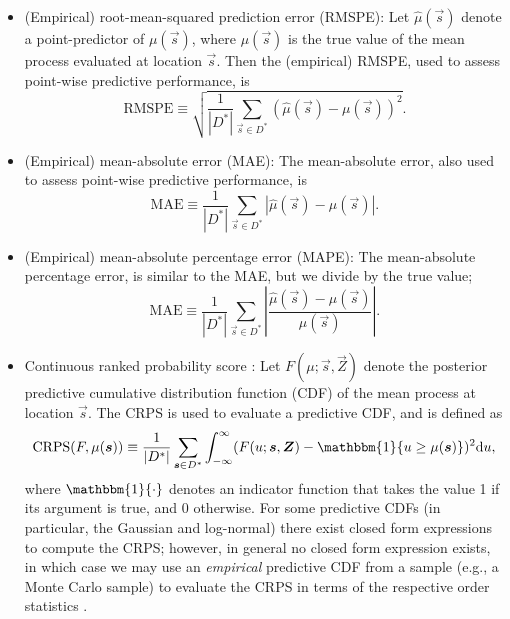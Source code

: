 \documentclass[12pt,a4paper]{article}
\begin{document}
\begin{appendices}
\begin{itemize}
    \item (Empirical) root-mean-squared prediction error (RMSPE): Let $\hat{\mu}(\vec{s})$ denote a point-predictor of $\mu(\vec{s})$, where $\mu(\vec{s})$ is the true value of the mean process evaluated at location $\vec{s}$. Then the (empirical) RMSPE, used to assess point-wise predictive performance, is
    \begin{equation*}
        \textrm{RMSPE}
        \equiv
        \sqrt{\frac{1}{|D^*|}\sum_{\vec{s} \in D^*}(\hat{\mu}(\vec{s}) - \mu(\vec{s}))^2}.
    \end{equation*}
    \item (Empirical) mean-absolute error (MAE): The mean-absolute error, also used to assess point-wise predictive performance, is
    \begin{equation*}
        \textrm{MAE}
        \equiv
        \frac{1}{|D^*|}\sum_{\vec{s} \in D^*}|\hat{\mu}(\vec{s}) - \mu(\vec{s})|.
    \end{equation*}
    \item (Empirical) mean-absolute percentage error (MAPE): The mean-absolute percentage error, is similar to the MAE, but we divide by the true value;
    \begin{equation*}
        \textrm{MAE}
        \equiv
        \frac{1}{|D^*|}\sum_{\vec{s} \in D^*}\left|\frac{\hat{\mu}(\vec{s}) - \mu(\vec{s})}{\mu(\vec{s})}\right|.
    \end{equation*}
    \item Continuous ranked probability score \citep[CRPS;][sec 4.2.]{Gneiting_2007_scoring_rules}: 
    Let $F(\mu; \vec{s}, \vec{Z})$ denote the posterior predictive cumulative distribution function (CDF) of the mean process at location $\vec{s}$. 
    The CRPS is used to evaluate a predictive CDF, and is defined as
    \begin{equation*}
    \textrm{CRPS}(F, \mu(\vec{s})) 
    \equiv \frac{1}{|D^*|}\sum_{\vec{s} \in D^*}
    \int_{-\infty}^\infty (F(u; \vec{s}, \vec{Z}) - \mathbbm{1}\{u \geq \mu(\vec{s})\})^2 \d u,
    \end{equation*}
    where $\mathbbm{1}\{ \cdot \}$ denotes an indicator function that takes the value 1 if its argument is true, and 0 otherwise. 
    For some predictive CDFs (in particular, the Gaussian and log-normal) there exist closed form expressions to compute the CRPS; however, in general no closed form expression exists, in which case we may use an \textit{empirical} predictive CDF from a sample (e.g., a Monte Carlo sample) to evaluate the CRPS in terms of the respective order statistics \citep{Hersbach_2000_CRPS}. 

\end{itemize}
\end{appendices}
\end{document}

